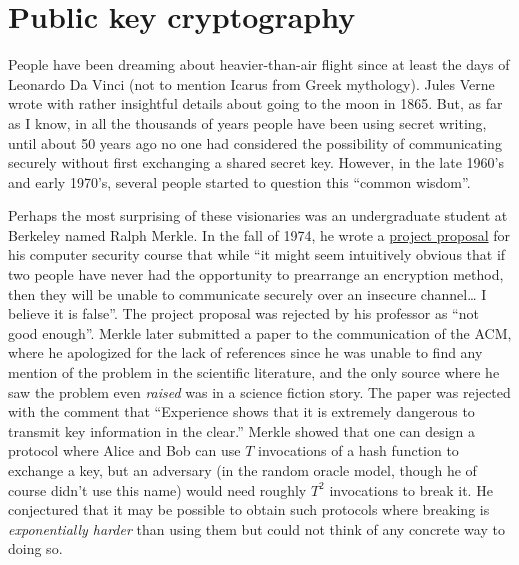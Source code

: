\chapter{Public key cryptography}\label{Public-key-cryptography}

People have been dreaming about heavier-than-air flight since at least
the days of Leonardo Da Vinci (not to mention Icarus from Greek
mythology). Jules Verne wrote with rather insightful details about going
to the moon in 1865. But, as far as I know, in all the thousands of
years people have been using secret writing, until about 50 years ago no
one had considered the possibility of communicating securely without
first exchanging a shared secret key. However, in the late 1960's and
early 1970's, several people started to question this ``common wisdom''.

Perhaps the most surprising of these visionaries was an undergraduate
student at Berkeley named Ralph Merkle. In the fall of 1974, he wrote a
\href{http://www.merkle.com/1974/}{project proposal} for his computer
security course that while ``it might seem intuitively obvious that if
two people have never had the opportunity to prearrange an encryption
method, then they will be unable to communicate securely over an
insecure channel\ldots{} I believe it is false''. The project proposal
was rejected by his professor as ``not good enough''. Merkle later
submitted a paper to the communication of the ACM, where he apologized
for the lack of references since he was unable to find any mention of
the problem in the scientific literature, and the only source where he
saw the problem even \emph{raised} was in a science fiction story. The
paper was rejected with the comment that ``Experience shows that it is
extremely dangerous to transmit key information in the clear.'' Merkle
showed that one can design a protocol where Alice and Bob can use \(T\)
invocations of a hash function to exchange a key, but an adversary (in
the random oracle model, though he of course didn't use this name) would
need roughly \(T^2\) invocations to break it. He conjectured that it may
be possible to obtain such protocols where breaking is
\emph{exponentially harder} than using them but could not think of any
concrete way to doing so.

